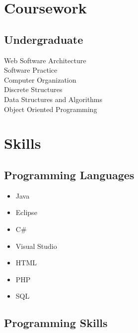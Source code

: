 \documentclass[letterpaper]{outline} %
\begin{document}
\begin{minipage}[t]{0.35\textwidth}
\sectionspace %


\section{Coursework}


\subsection{Undergraduate}

Web Software Architecture \\
Software Practice \\
Computer Organization \\
Discrete Structures \\
Data Structures and Algorithms \\
Object Oriented Programming \\





\sectionspace %


\section{Skills}

\subsection{Programming Languages}
\begin{itemize}	

\item Java
\item Eclipse
\item C\#
\item Visual Studio
\item HTML
\item PHP
\item SQL

\end{itemize}

\sectionspace

\subsection{Programming Skills}
\begin{itemize}
\sectionspace


\end{itemize}
\end{minipage}
\end{document}
